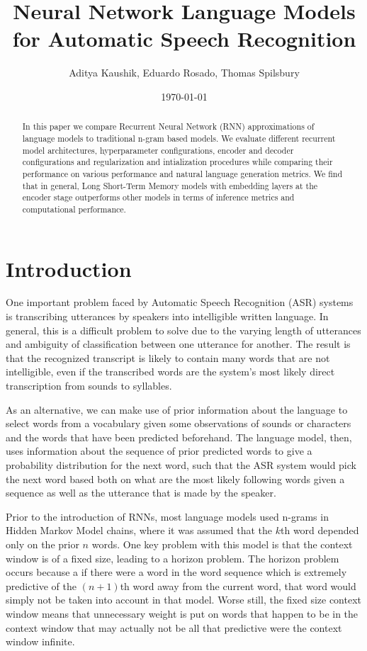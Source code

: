\documentclass[a4paper]{article}
\title{Neural Network Language Models for Automatic Speech Recognition}
\author{Aditya Kaushik, Eduardo Rosado, Thomas Spilsbury}
\date{\today}
\begin{document}
\maketitle

\begin{abstract}
In this paper we compare Recurrent Neural Network (RNN)
approximations of language models to traditional n-gram based models.
We evaluate different recurrent model architectures, hyperparameter configurations,
encoder and decoder configurations and regularization and intialization procedures
while comparing their performance on various performance and natural language
generation metrics. We find that in general, Long Short-Term Memory models
with embedding layers at the encoder stage outperforms other models
in terms of inference metrics and computational performance.
\end{abstract}

\section{Introduction}
\label{sec:introduction}

One important problem faced by Automatic Speech Recognition (ASR)
systems is transcribing utterances by speakers into intelligible written language.
In general, this is a difficult problem to solve due to the varying length
of utterances and ambiguity of classification between one utterance for another. The result
is that the recognized transcript is likely
to contain many words that are not
intelligible, even if the transcribed words
are the system's most likely direct
transcription from sounds to syllables.

As an alternative, we can make use of prior
information about the language to select
words from a vocabulary given some
observations of sounds or characters and the words
that have been predicted beforehand. The language model,
then, uses information about the sequence of prior
predicted words to give a probability distribution
for the next word, such that the ASR system would
pick the next word based both on what are the most
likely following words given a sequence as well
as the utterance that is made by the speaker.

Prior to the introduction of RNNs, most language models used n-grams
in Hidden Markov Model chains, where it was assumed that the $k$th
word depended only on the prior $n$ words. One key problem
with this model is that the context window is of a fixed size, leading
to a horizon problem. The horizon problem occurs because a if there were a word
in the word sequence which is extremely predictive of the $(n + 1)$th
word away from the current word, that word would simply not be taken
into account in that model. Worse still, the fixed size context window
means that unnecessary weight is put on words that happen to be in the context
window that may actually not be all that predictive were the context window
infinite.
\end{document}
